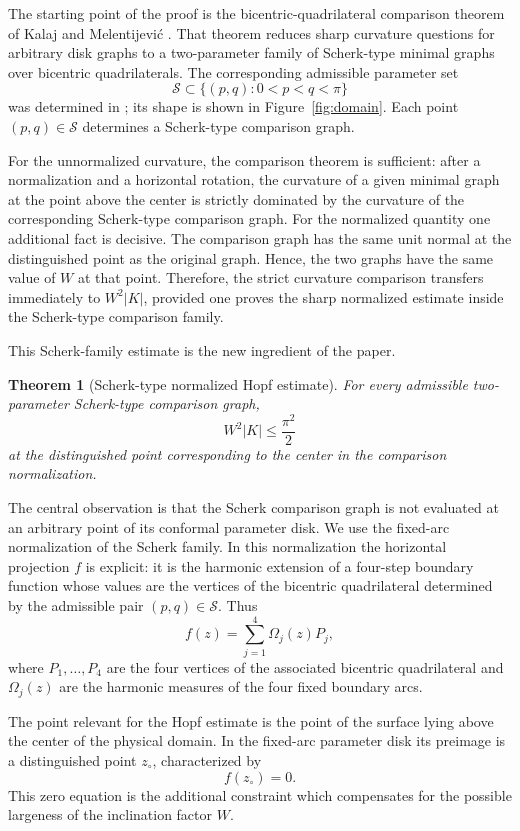 \documentclass[11pt]{amsart}
\newtheorem{theorem}{Theorem}[section]
\theoremstyle{remark}
\numberwithin{equation}{section}
\begin{document}
The starting point of the proof is the bicentric-quadrilateral comparison
theorem of Kalaj and Melentijevi\'c \cite{KalajMelentijevic2026}.  That
theorem reduces sharp curvature questions for arbitrary disk graphs to a
two-parameter family of Scherk-type minimal graphs over bicentric
quadrilaterals.  The corresponding admissible parameter set
\[
        \mathcal S\subset\{(p,q):0<p<q<\pi\}
\]
was determined in \cite{KalajMelentijevic2026}; its shape is shown in
Figure~\ref{fig:domain}.  Each point \((p,q)\in\mathcal S\) determines a
Scherk-type comparison graph.

For the unnormalized curvature, the comparison theorem is sufficient: after
a normalization and a horizontal rotation, the curvature of a given minimal
graph at the point above the center is strictly dominated by the curvature
of the corresponding Scherk-type comparison graph.  For the normalized
quantity one additional fact is decisive.  The comparison graph has the same
unit normal at the distinguished point as the original graph.  Hence, the two
graphs have the same value of \(W\) at that point.  Therefore, the strict
curvature comparison transfers immediately to \(W^2|K|\), provided one proves
the sharp normalized estimate inside the Scherk-type comparison family.

This Scherk-family estimate is the new ingredient of the paper.

\begin{theorem}[Scherk-type normalized Hopf estimate]\label{thm:scherk-main}
For every admissible two-parameter Scherk-type comparison graph,
\[
        W^2|K|\leq \frac{\pi^2}{2}
\]
at the distinguished point corresponding to the center in the comparison
normalization.
\end{theorem}

The central observation is that the Scherk comparison graph is not evaluated
at an arbitrary point of its conformal parameter disk.  We use the fixed-arc
normalization of the Scherk family.  In this normalization the horizontal
projection \(f\) is explicit: it is the harmonic extension of a four-step
boundary function whose values are the vertices of the bicentric quadrilateral
determined by the admissible pair \((p,q)\in\mathcal S\).  Thus
\[
        f(z)=\sum_{j=1}^4 \Omega_j(z)P_j,
\]
where \(P_1,\ldots,P_4\) are the four vertices of the associated bicentric
quadrilateral and \(\Omega_j(z)\) are the harmonic measures of the four fixed
boundary arcs.

The point relevant for the Hopf estimate is the point of the surface lying
above the center of the physical domain.  In the fixed-arc parameter disk its
preimage is a distinguished point \(z_\circ\), characterized by
\[
        f(z_\circ)=0.
\]
This zero equation is the additional constraint which compensates for the
possible largeness of the inclination factor \(W\).
\end{document}
